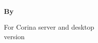 \begin{titlepage}
\AddToShipoutPicture*{\BackgroundPic}




\includegraphics{Images/pixel.png}\\[187mm] 
{
\raggedleft
\Large \textbf{By \authornames}\\
}

\vfill
{
\large For Corina server and desktop\\
version \versionnumber\\[4mm]
}



\end{titlepage}